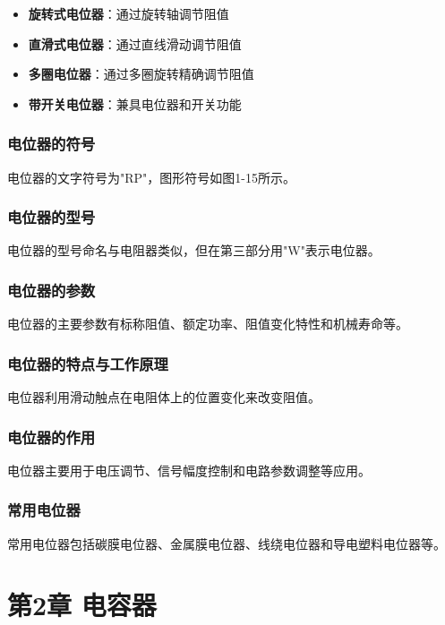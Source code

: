 \documentclass[12pt,UTF8]{ctexbook}
\begin{document}
\begin{itemize}[leftmargin=2cm]
	\item \textbf{旋转式电位器}：通过旋转轴调节阻值
	\item \textbf{直滑式电位器}：通过直线滑动调节阻值
	\item \textbf{多圈电位器}：通过多圈旋转精确调节阻值
	\item \textbf{带开关电位器}：兼具电位器和开关功能
\end{itemize}

\subsection{电位器的符号}

电位器的文字符号为"RP"，图形符号如图1-15所示。

\subsection{电位器的型号}

电位器的型号命名与电阻器类似，但在第三部分用"W"表示电位器。

\subsection{电位器的参数}

电位器的主要参数有标称阻值、额定功率、阻值变化特性和机械寿命等。

\subsection{电位器的特点与工作原理}

电位器利用滑动触点在电阻体上的位置变化来改变阻值。

\subsection{电位器的作用}

电位器主要用于电压调节、信号幅度控制和电路参数调整等应用。

\subsection{常用电位器}

常用电位器包括碳膜电位器、金属膜电位器、线绕电位器和导电塑料电位器等。

\chapter{第2章 电容器}
\end{document}
